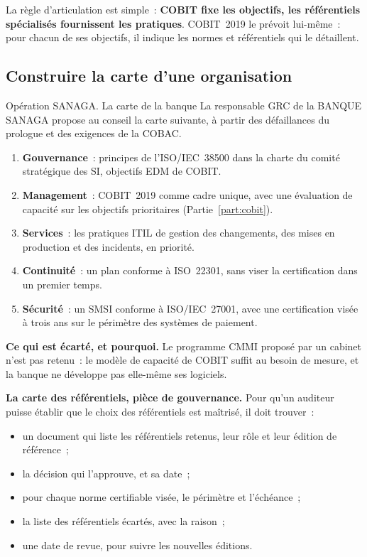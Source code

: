 La règle d'articulation est simple~: \textbf{COBIT fixe les objectifs, les
référentiels spécialisés fournissent les pratiques}. COBIT~2019 le prévoit
lui-même~: pour chacun de ses objectifs, il indique les normes et
référentiels qui le détaillent.

\subsection{Construire la carte d'une organisation}

\begin{boxscenario}{Opération SANAGA. La carte de la banque}
La responsable GRC de la BANQUE SANAGA propose au conseil la carte
suivante, à partir des défaillances du prologue et des exigences de la
COBAC.
\begin{enumerate}
    \item \textbf{Gouvernance}~: principes de l'ISO/IEC~38500 dans la
          charte du comité stratégique des SI, objectifs EDM de COBIT.
    \item \textbf{Management}~: COBIT~2019 comme cadre unique, avec une
          évaluation de capacité sur les objectifs prioritaires
          (Partie~\ref{part:cobit}).
    \item \textbf{Services}~: les pratiques ITIL de gestion des
          changements, des mises en production et des incidents, en
          priorité.
    \item \textbf{Continuité}~: un plan conforme à ISO~22301, sans viser la
          certification dans un premier temps.
    \item \textbf{Sécurité}~: un SMSI conforme à ISO/IEC~27001, avec une
          certification visée à trois ans sur le périmètre des systèmes de
          paiement.
\end{enumerate}
\textbf{Ce qui est écarté, et pourquoi.} Le programme CMMI proposé par un
cabinet n'est pas retenu~: le modèle de capacité de COBIT suffit au
besoin de mesure, et la banque ne développe pas elle-même ses logiciels.
\end{boxscenario}

\begin{boxprocedure}
\textbf{La carte des référentiels, pièce de gouvernance.} Pour qu'un
auditeur puisse établir que le choix des référentiels est maîtrisé, il
doit trouver~:
\begin{itemize}
    \item un document qui liste les référentiels retenus, leur rôle et leur
          édition de référence~;
    \item la décision qui l'approuve, et sa date~;
    \item pour chaque norme certifiable visée, le périmètre et l'échéance~;
    \item la liste des référentiels écartés, avec la raison~;
    \item une date de revue, pour suivre les nouvelles éditions.
\end{itemize}
\end{boxprocedure}

